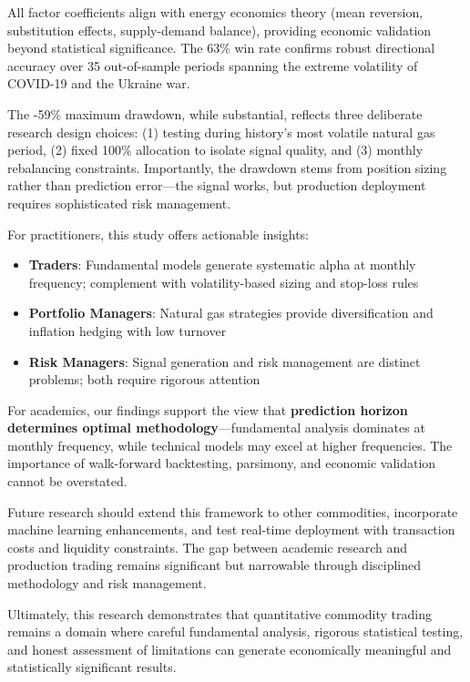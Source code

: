 \documentclass[12pt,a4paper]{article}
\begin{document}
All factor coefficients align with energy economics theory (mean reversion, substitution effects, supply-demand balance), providing economic validation beyond statistical significance. The 63\% win rate confirms robust directional accuracy over 35 out-of-sample periods spanning the extreme volatility of COVID-19 and the Ukraine war.

The -59\% maximum drawdown, while substantial, reflects three deliberate research design choices: (1) testing during history's most volatile natural gas period, (2) fixed 100\% allocation to isolate signal quality, and (3) monthly rebalancing constraints. Importantly, the drawdown stems from position sizing rather than prediction error—the signal works, but production deployment requires sophisticated risk management.

For practitioners, this study offers actionable insights:

\begin{itemize}
    \item \textbf{Traders}: Fundamental models generate systematic alpha at monthly frequency; complement with volatility-based sizing and stop-loss rules

    \item \textbf{Portfolio Managers}: Natural gas strategies provide diversification and inflation hedging with low turnover

    \item \textbf{Risk Managers}: Signal generation and risk management are distinct problems; both require rigorous attention
\end{itemize}

For academics, our findings support the view that \textbf{prediction horizon determines optimal methodology}—fundamental analysis dominates at monthly frequency, while technical models may excel at higher frequencies. The importance of walk-forward backtesting, parsimony, and economic validation cannot be overstated.

Future research should extend this framework to other commodities, incorporate machine learning enhancements, and test real-time deployment with transaction costs and liquidity constraints. The gap between academic research and production trading remains significant but narrowable through disciplined methodology and risk management.

Ultimately, this research demonstrates that quantitative commodity trading remains a domain where careful fundamental analysis, rigorous statistical testing, and honest assessment of limitations can generate economically meaningful and statistically significant results.
\end{document}
